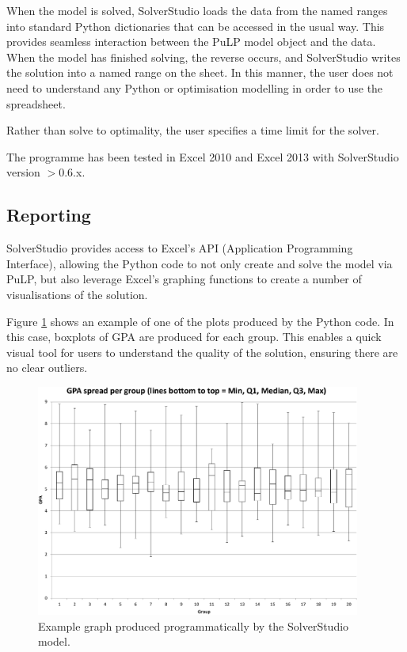 \documentclass[12pt]{ORSNZ}
\begin{document}
When the model is solved, SolverStudio loads the data from the named ranges into standard Python dictionaries that can be accessed in the usual way. This provides seamless interaction between the PuLP model object and the data. When the model has finished solving, the reverse occurs, and SolverStudio writes the solution into a named range on the sheet. In this manner, the user does not need to understand any Python or optimisation modelling in order to use the spreadsheet.

Rather than solve to optimality, the user specifies a time limit for the solver.

The programme has been tested in Excel 2010 and Excel 2013 with SolverStudio version $>$0.6.x.

\subsection{Reporting} \label{reporting}
SolverStudio provides access to Excel's API (Application Programming Interface), allowing the Python code to not only create and solve the model via PuLP, but also leverage Excel's graphing functions to create a number of visualisations of the solution.

Figure \ref{FIG:solverstudio_boxplot} shows an example of one of the plots produced by the Python code. In this case, boxplots of GPA are produced for each group. This enables a quick visual tool for users to understand the quality of the solution, ensuring there are no clear outliers.

\begin{figure}[!ht]
    \centering
    \includegraphics[width=0.95\textwidth]{solverstudio_boxplot_c.pdf}
    \caption{Example graph produced programmatically by the SolverStudio model.}
    \label{FIG:solverstudio_boxplot}
\end{figure}
\end{document}
